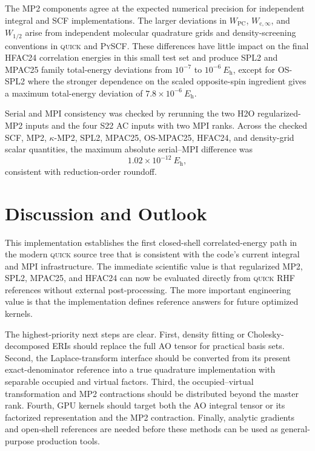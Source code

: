 \documentclass[aip,jcp,reprint,superscriptaddress]{revtex4-2}
\newcommand{\quick}{\textsc{quick}}
\newcommand{\pyscf}{\textsc{PySCF}}
\newcommand{\Eh}{E_{\mathrm{h}}}
\newcommand{\Wcinf}{W_{\mathrm{c},\infty}}
\newcommand{\Whalf}{W_{1/2}}
\begin{document}
The MP2 components agree at the expected numerical precision for independent integral and SCF implementations.  The larger deviations in \(W_{\mathrm{PC}}\), \(\Wcinf\), and \(\Whalf\) arise from independent molecular quadrature grids and density-screening conventions in \quick{} and \pyscf{}.  These differences have little impact on the final HFAC24 correlation energies in this small test set and produce SPL2 and MPAC25 family total-energy deviations from \(10^{-7}\) to \(10^{-6}\ \Eh\), except for OS-SPL2 where the stronger dependence on the scaled opposite-spin ingredient gives a maximum total-energy deviation of \(7.8\times10^{-6}\ \Eh\).

Serial and MPI consistency was checked by rerunning the two H2O regularized-MP2 inputs and the four S22 AC inputs with two MPI ranks.  Across the checked SCF, MP2, \(\kappa\)-MP2, SPL2, MPAC25, OS-MPAC25, HFAC24, and density-grid scalar quantities, the maximum absolute serial--MPI difference was
\begin{equation}
  1.02\times10^{-12}\ \Eh,
\end{equation}
consistent with reduction-order roundoff.

\section{Discussion and Outlook}

This implementation establishes the first closed-shell correlated-energy path in the modern \quick{} source tree that is consistent with the code's current integral and MPI infrastructure.  The immediate scientific value is that regularized MP2, SPL2, MPAC25, and HFAC24 can now be evaluated directly from \quick{} RHF references without external post-processing.  The more important engineering value is that the implementation defines reference answers for future optimized kernels.

The highest-priority next steps are clear.  First, density fitting or Cholesky-decomposed ERIs should replace the full AO tensor for practical basis sets.  Second, the Laplace-transform interface should be converted from its present exact-denominator reference into a true quadrature implementation with separable occupied and virtual factors.  Third, the occupied--virtual transformation and MP2 contractions should be distributed beyond the master rank.  Fourth, GPU kernels should target both the AO integral tensor or its factorized representation and the MP2 contraction.  Finally, analytic gradients and open-shell references are needed before these methods can be used as general-purpose production tools.
\end{document}
